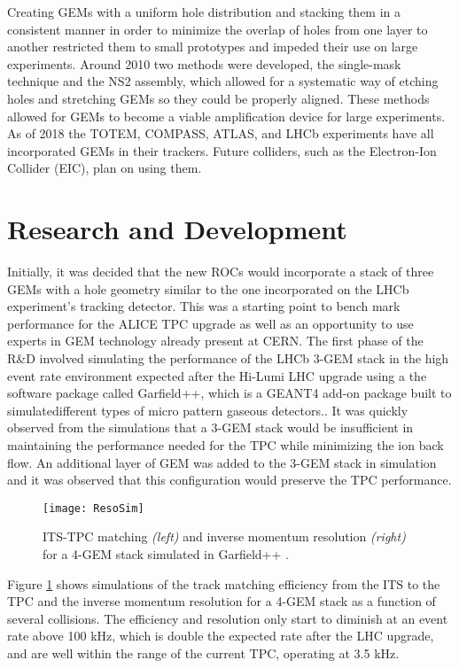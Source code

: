 Creating GEMs with a uniform hole distribution and stacking them in a consistent manner in order to minimize the overlap of holes from one layer to another restricted them to small prototypes and impeded their use on large experiments.  Around 2010 two methods were developed, the single-mask technique\cite{0960-1317-17-8-021} and the NS2 assembly\cite{1748-0221-12-06-C06036}, which allowed for a systematic way of etching holes and stretching GEMs so they could be properly aligned.  These methods allowed for GEMs to become a viable amplification device for large experiments.  As of 2018 the TOTEM, COMPASS, ATLAS, and LHCb experiments have all incorporated GEMs in their trackers.  Future colliders, such as the Electron-Ion Collider (EIC), plan on using them\cite{SAULI20162}.


\section{Research and Development}

Initially, it was decided that the new ROCs would incorporate a stack of three GEMs with a hole geometry similar to the one incorporated on the LHCb experiment's\cite{Santimaria:1690550} tracking detector.  This was a starting point to bench mark performance for the ALICE TPC upgrade as well as an opportunity to use experts in GEM technology already present at CERN.  The first phase of the R\&D involved simulating the performance of the LHCb 3-GEM stack in the high event rate environment expected  after the Hi-Lumi LHC upgrade using a the software package called Garfield++\cite{PFEIFFER2019121}, which is a GEANT4\cite{Agostinelli:2002hh} add-on package built to simulatedifferent types of micro pattern gaseous detectors..  It was quickly observed from the simulations that a 3-GEM stack would be insufficient in maintaining the performance needed for the TPC while minimizing the ion back flow.  An additional layer of GEM was added to the 3-GEM stack in simulation and it was observed that this configuration would preserve the TPC performance.

\begin{figure}[h]
\texttt{[image: ResoSim]}
\centering
\caption{ITS-TPC matching  \textit{(left)} and inverse momentum resolution \textit{(right)} for a 4-GEM stack simulated in Garfield++ \cite{Dick2017QM}. }
\label{fig:ResoSim}
\end{figure}

\noindent
Figure \ref{fig:ResoSim} shows simulations of the track matching efficiency from the ITS to the TPC and the inverse momentum resolution for a 4-GEM stack as a function of several collisions.  The efficiency and resolution only start to diminish at an event rate above 100 kHz, which is double the expected rate after the LHC upgrade, and are well within the range of the current TPC, operating at 3.5 kHz.
 
